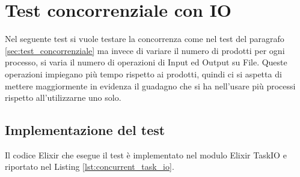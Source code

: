 \section{Test concorrenziale con IO}

Nel seguente test si vuole testare la concorrenza
come nel test del paragrafo \ref{sec:test_concorrenziale}
ma invece di variare il numero di prodotti per ogni
processo, si varia il numero di operazioni di Input
ed Output su File. Queste operazioni impiegano più tempo
rispetto ai prodotti, quindi ci si aspetta di mettere
maggiormente in evidenza il guadagno che si ha nell'usare più
processi rispetto all'utilizzarne uno solo.

\subsection{Implementazione del test}

Il codice Elixir che esegue il test è
implementato nel modulo Elixir TaskIO e
riportato nel Listing \ref{lst:concurrent_task_io}.


